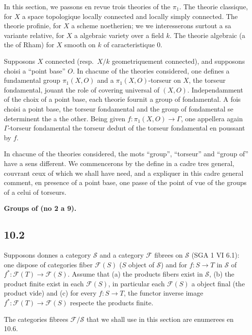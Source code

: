 \documentclass[12pt,a4paper]{article}
\theoremstyle{plain}
\theoremstyle{definition}
\theoremstyle{remark}
\begin{document}
In this section, we passons en revue trois theories of the $\pi_1$. The theorie classique, for $X$ a space topologique locally connected and locally simply connected. The theorie profinie, for $X$ a scheme noetherien; we we interesserons surtout a sa variante relative, for $X$ a algebraic variety over a field $k$. The theorie algebraic (a the of Rham) for $X$ smooth on $k$ of caracteristique 0.

Supposons $X$ connected (resp.~$X/k$ geometriquement connected), and supposons choisi a ``point base'' $O$. In chacune of the theories considered, one defines a fundamental group $\pi_1(X, O)$ and a $\pi_1(X, O)$-torseur on $X$, the torseur fondamental, jouant the role of covering universal of $(X, O)$. Independamment of the choix of a point base, each theorie fournit a group of fondamental. A fois choisi a point base, the torseur fondamental and the group of fondamental se determinent the a the other. Being given $f: \pi_1(X,O) \to \Gamma$, one appellera again $\Gamma$-torseur fondamental the torseur dedu\i t of the torseur fondamental en poussant by $f$.

In chacune of the theories considered, the mots ``group'', ``torseur'' and ``group of'' have a sens different. We commencerons by the define in a cadre tres general, couvrant ceux of which we shall have need, and a expliquer in this cadre general comment, en presence of a point base, one passe of the point of vue of the groups of a celui of torseurs.

\textbf{Groups of (no 2 a 9).}

\subsection*{10.2}

Supposons donnes a category $\mathcal{S}$ and a category $\mathcal{F}$ fibrees on $\mathcal{S}$ (SGA 1 VI 6.1): one dispose of categories fiber $\mathcal{F}(S)$ ($S$ object of $\mathcal{S}$) and for $f: S \to T$ in $\mathcal{S}$ of $f^*: \mathcal{F}(T) \to \mathcal{F}(S)$. Assume that (a) the products fibers exist in $\mathcal{S}$, (b) the product finite exist in each $\mathcal{F}(S)$, in particular each $\mathcal{F}(S)$ a object final (the product vide) and (c) for every $f: S \to T$, the functor inverse image $f^*: \mathcal{F}(T) \to \mathcal{F}(S)$ respecte the products finite.

The categories fibrees $\mathcal{F}/\mathcal{S}$ that we shall use in this section are enumerees en 10.6.
\end{document}
